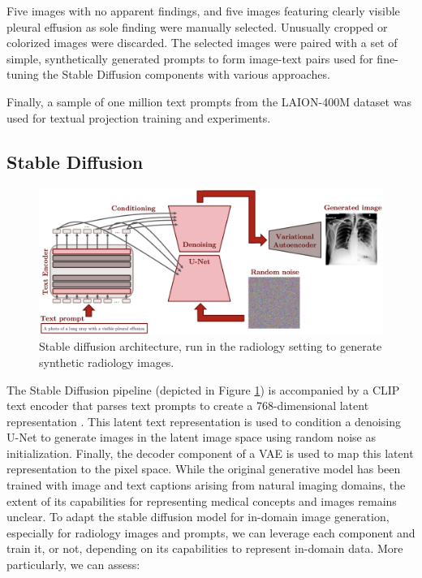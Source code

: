\documentclass{article}
\begin{document}
Five images with no apparent findings, and five images featuring clearly visible pleural effusion as sole finding were manually selected. Unusually cropped or colorized images were discarded. The selected images were paired with a set of simple, synthetically generated prompts to form image-text pairs used for fine-tuning the Stable Diffusion components with various approaches.

Finally, a sample of one million text prompts from the LAION-400M dataset 
was used for textual projection training and experiments.

\subsection{Stable Diffusion}

\begin{figure}
  \centering
    \includegraphics[width=130mm]{stable_diffusion_architecture.png}
  \caption{Stable diffusion architecture, run in the radiology setting to generate synthetic radiology images.}
  \label{figure-stable-diffusion}
\end{figure}

The Stable Diffusion pipeline (depicted in Figure \ref{figure-stable-diffusion}) is accompanied by a CLIP text encoder that parses text prompts to create a 768-dimensional latent representation \citep{clip2021}. This latent text representation is used to condition a denoising U-Net to generate images in the latent image space using random noise as initialization. Finally, the decoder component of a VAE is used to map this latent representation to the pixel space. While the original generative model has been trained with image and text captions arising from natural imaging domains, the extent of its capabilities for representing medical concepts and images remains unclear.  
To adapt the stable diffusion model for in-domain image generation, especially for radiology images and prompts, we can leverage each component and train it, or not, depending on its capabilities to represent in-domain data. More particularly, we can assess:
\end{document}
